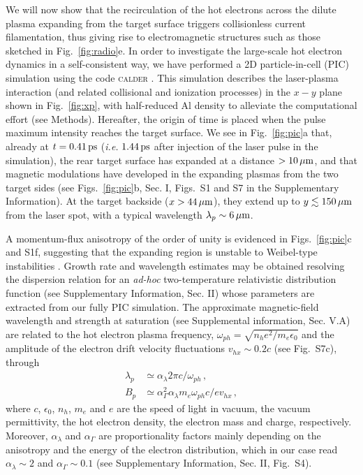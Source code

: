 \documentclass[aps,twocolumn,showpacs,superscriptaddress]{revtex4}
\begin{document}
We will now show that the recirculation of the hot electrons across the dilute plasma expanding from the target surface triggers collisionless current filamentation, thus giving rise to electromagnetic structures such as those sketched in Fig.~\ref{fig:radio}e. In order to investigate the large-scale hot electron dynamics in a self-consistent way, we have performed a 2D particle-in-cell (PIC) simulation using the code \textsc{calder} \cite{NF_Lefebvre_2003}. This simulation describes the laser-plasma interaction (and related collisional and ionization processes) in the $x-y$ plane shown in Fig.~\ref{fig:xp}, with half-reduced Al density to alleviate the computational effort (see Methods).
Hereafter, the origin of time is placed when the pulse maximum intensity reaches the target surface. 
We see in Fig.~\ref{fig:pic}a that, already at $t=0.41\, \rm ps$ (\emph{i.e.} $1.44\,\rm ps$ after injection of the laser pulse in the simulation), the rear target surface has expanded at a distance $>10\,\rm \mu m$, and that magnetic modulations have developed in the expanding plasmas from the two target sides (see Figs.~\ref{fig:pic}b, Sec. I,  Figs.~S1 and S7 in the Supplementary Information). At the target backside ($x>44\,\rm \mu m$), they extend up to $y \lesssim 150\,\rm \mu m$ from the laser spot, with a typical wavelength $\lambda_p \sim 6\,\rm \mu m$.

A momentum-flux anisotropy of the order of unity is  evidenced in Figs.~\ref{fig:pic}c and S1f, suggesting that the expanding region is unstable to Weibel-type instabilities \cite{POP_Ren_2006, PRL_Gode_2017}. Growth rate and wavelength estimates may be obtained resolving the dispersion relation  for an \emph{ad-hoc} two-temperature relativistic distribution function (see Supplementary Information, Sec. II) whose parameters are extracted from our fully PIC simulation.
The approximate magnetic-field wavelength and strength at saturation (see Supplemental information, Sec. V.A) are related to the hot electron plasma frequency, $\omega_{ph}=\sqrt{n_h e^2/m_e \epsilon_0}$ and the amplitude of the electron drift velocity fluctuations $v_{hx}\sim 0.2c$ (see Fig.~S7c), through 
\begin{align}
  \lambda_p &\simeq \alpha_\lambda 2\pi c/\omega_{ph} \label{eq:lp}  \,,\\
  B_p &\simeq \alpha_\Gamma^2\alpha_\lambda m_e \omega_{ph}c/ ev_{hx} \label{eq:bp} \,, 
\end{align}
where $c$, $\epsilon_0$, $n_h$, $m_e$ and $e$ are the speed of light in vacuum, the vacuum permittivity, the hot electron density, the electron mass and  charge, respectively. Moreover, $\alpha_\lambda $ and $\alpha_\Gamma $ are proportionality factors mainly depending on the anisotropy and the energy of the  electron distribution,  which in our case read $\alpha_\lambda\sim 2 $ and $\alpha_\Gamma\sim 0.1 $ (see Supplementary Information, Sec. II, Fig.~S4).
\end{document}

